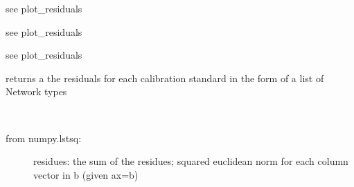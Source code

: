 \documentclass[letterpaper,10pt,english]{sphinxmanual}
\begin{document}
\begin{fulllineitems}
\begin{fulllineitems}
\label{api/mwavepy.calibration:mwavepy.calibration.calibration.Calibration.plot_residuals_db}
see plot\_residuals

\end{fulllineitems}


\begin{fulllineitems}
\label{api/mwavepy.calibration:mwavepy.calibration.calibration.Calibration.plot_residuals_mag}
see plot\_residuals

\end{fulllineitems}


\begin{fulllineitems}
\label{api/mwavepy.calibration:mwavepy.calibration.calibration.Calibration.plot_residuals_smith}
see plot\_residuals

\end{fulllineitems}


\begin{fulllineitems}
\label{api/mwavepy.calibration:mwavepy.calibration.calibration.Calibration.residual_ntwks}
returns a the residuals for each calibration standard in the 
form of a list of Network types

\end{fulllineitems}


\begin{fulllineitems}
\label{api/mwavepy.calibration:mwavepy.calibration.calibration.Calibration.residuals}~\begin{description}
\item[{from numpy.lstsq:}] \leavevmode
residues:
the sum of the residues; squared euclidean norm for 
each column vector in b (given ax=b)


\end{description}
\end{fulllineitems}
\end{fulllineitems}
\end{document}
